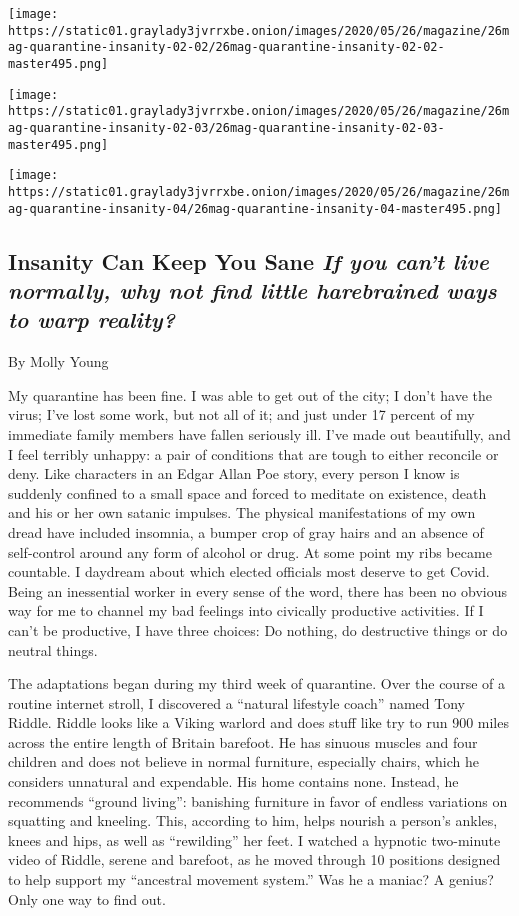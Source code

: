 \texttt{[image: https://static01.graylady3jvrrxbe.onion/images/2020/05/26/magazine/26mag-quarantine-insanity-02-02/26mag-quarantine-insanity-02-02-master495.png]}

\texttt{[image: https://static01.graylady3jvrrxbe.onion/images/2020/05/26/magazine/26mag-quarantine-insanity-02-03/26mag-quarantine-insanity-02-03-master495.png]}

\texttt{[image: https://static01.graylady3jvrrxbe.onion/images/2020/05/26/magazine/26mag-quarantine-insanity-04/26mag-quarantine-insanity-04-master495.png]}

\hypertarget{insanity-can-keep-you-sane-if-you-cant-live-normally-why-not-find-little-harebrained-ways-to-warp-reality}{%
\subsection{\texorpdfstring{Insanity Can Keep You Sane \emph{If you
can't live normally, why not find little harebrained ways to warp
reality?}}{Insanity Can Keep You Sane If you can't live normally, why not find little harebrained ways to warp reality?}}\label{insanity-can-keep-you-sane-if-you-cant-live-normally-why-not-find-little-harebrained-ways-to-warp-reality}}

By Molly Young

My quarantine has been fine. I was able to get out of the city; I don't
have the virus; I've lost some work, but not all of it; and just under
17 percent of my immediate family members have fallen seriously ill.
I've made out beautifully, and I feel terribly unhappy: a pair of
conditions that are tough to either reconcile or deny. Like characters
in an Edgar Allan Poe story, every person I know is suddenly confined to
a small space and forced to meditate on existence, death and his or her
own satanic impulses. The physical manifestations of my own dread have
included insomnia, a bumper crop of gray hairs and an absence of
self-control around any form of alcohol or drug. At some point my ribs
became countable. I daydream about which elected officials most deserve
to get Covid. Being an inessential worker in every sense of the word,
there has been no obvious way for me to channel my bad feelings into
civically productive activities. If I can't be productive, I have three
choices: Do nothing, do destructive things or do neutral things.

The adaptations began during my third week of quarantine. Over the
course of a routine internet stroll, I discovered a ``natural lifestyle
coach'' named Tony Riddle. Riddle looks like a Viking warlord and does
stuff like try to run 900 miles across the entire length of Britain
barefoot. He has sinuous muscles and four children and does not believe
in normal furniture, especially chairs, which he considers unnatural and
expendable. His home contains none. Instead, he recommends ``ground
living'': banishing furniture in favor of endless variations on
squatting and kneeling. This, according to him, helps nourish a person's
ankles, knees and hips, as well as ``rewilding'' her feet. I watched a
hypnotic two-minute video of Riddle, serene and barefoot, as he moved
through 10 positions designed to help support my ``ancestral movement
system.'' Was he a maniac? A genius? Only one way to find out.


